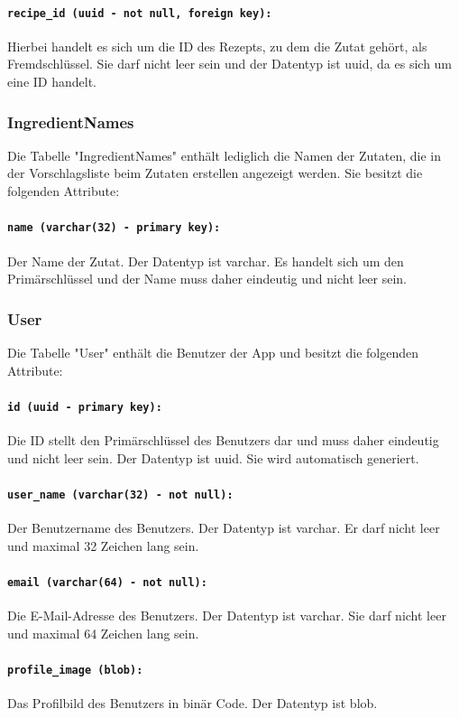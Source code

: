 \documentclass{entwurfsheft}
\begin{document}
\begin{sloppypar}
\paragraph{\texttt{recipe\_id (uuid - not null, foreign key):}} Hierbei handelt es sich um die ID des Rezepts, zu dem die Zutat gehört, als Fremdschlüssel. Sie darf nicht leer sein und der Datentyp ist \Gls{uuid}, da es sich um eine ID handelt.
\newpage
\subsubsection{IngredientNames}
Die Tabelle "IngredientNames" enthält lediglich die Namen der Zutaten, die in der Vorschlagsliste beim Zutaten erstellen angezeigt werden. Sie besitzt die folgenden Attribute:
\paragraph{\texttt{name (varchar(32) - primary key):}} Der Name der Zutat. Der Datentyp ist \Gls{varchar}. Es handelt sich um den Primärschlüssel und der Name muss daher eindeutig und nicht leer sein.
\newpage
\subsubsection{User}
Die Tabelle "User" enthält die Benutzer der App und besitzt die folgenden Attribute:
\paragraph{\texttt{id (uuid - primary key):}} Die ID stellt den Primärschlüssel des Benutzers dar und muss daher eindeutig und nicht leer sein. Der Datentyp ist \Gls{uuid}. Sie wird automatisch generiert.
\paragraph{\texttt{user\_name (varchar(32) - not null):}} Der Benutzername des Benutzers. Der Datentyp ist \Gls{varchar}. Er darf nicht leer und maximal 32 Zeichen lang sein.
\paragraph{\texttt{email (varchar(64) - not null):}} Die E-Mail-Adresse des Benutzers. Der Datentyp ist \Gls{varchar}. Sie darf nicht leer und maximal 64 Zeichen lang sein.
\paragraph{\texttt{profile\_image (blob):}} Das Profilbild des Benutzers in binär Code. Der Datentyp ist \Gls{blob}.

\end{sloppypar}
\end{document}
